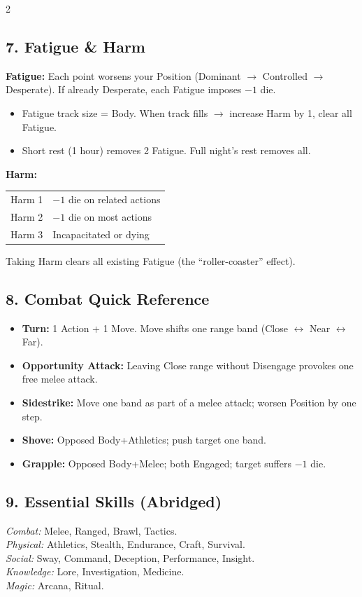 \documentclass[10pt,landscape]{article}
\begin{document}
\begin{multicols}{2}
\subsection*{7. Fatigue \& Harm}
\textbf{Fatigue:} Each point worsens your Position (Dominant $\rightarrow$ Controlled $\rightarrow$ Desperate). If already Desperate, each Fatigue imposes $-1$ die.
\begin{itemize}
    \item Fatigue track size = Body. When track fills $\rightarrow$ increase Harm by 1, clear all Fatigue.
    \item Short rest (1 hour) removes 2 Fatigue. Full night's rest removes all.
\end{itemize}
\textbf{Harm:} 
\begin{tabularx}{\linewidth}{X X}
Harm 1 & $-1$ die on related actions \\
Harm 2 & $-1$ die on most actions \\
Harm 3 & Incapacitated or dying \\
\end{tabularx}
\vspace{0.5ex}
Taking Harm clears all existing Fatigue (the ``roller-coaster'' effect).

\subsection*{8. Combat Quick Reference}
\begin{itemize}
    \item \textbf{Turn:} 1 Action + 1 Move. Move shifts one range band (Close $\leftrightarrow$ Near $\leftrightarrow$ Far).
    \item \textbf{Opportunity Attack:} Leaving Close range without Disengage provokes one free melee attack.
    \item \textbf{Sidestrike:} Move one band as part of a melee attack; worsen Position by one step.
    \item \textbf{Shove:} Opposed Body+Athletics; push target one band.
    \item \textbf{Grapple:} Opposed Body+Melee; both Engaged; target suffers $-1$ die.
\end{itemize}
\vfill\null
\columnbreak

\subsection*{9. Essential Skills (Abridged)}
\textit{Combat:} Melee, Ranged, Brawl, Tactics. \\
\textit{Physical:} Athletics, Stealth, Endurance, Craft, Survival. \\
\textit{Social:} Sway, Command, Deception, Performance, Insight. \\
\textit{Knowledge:} Lore, Investigation, Medicine. \\
\textit{Magic:} Arcana, Ritual.


\end{multicols}
\end{document}
